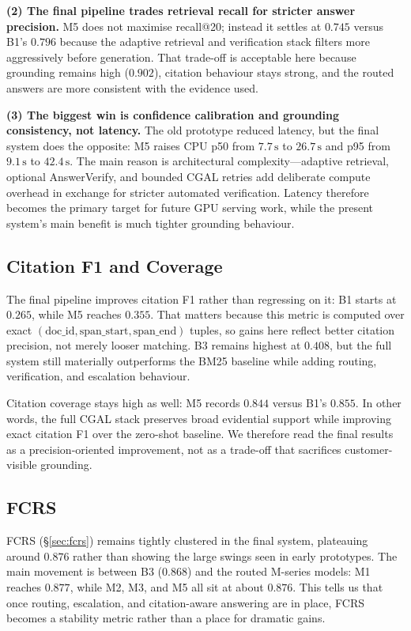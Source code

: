 \documentclass[11pt,a4paper,twocolumn]{article}
\begin{document}
\textbf{(2) The final pipeline trades retrieval recall for stricter answer
precision.} M5 does not maximise recall@20; instead it settles at $0.745$
versus B1's $0.796$ because the adaptive retrieval and verification stack
filters more aggressively before generation. That trade-off is acceptable
here because grounding remains high ($0.902$), citation behaviour stays
strong, and the routed answers are more consistent with the evidence used.

\textbf{(3) The biggest win is confidence calibration and grounding
consistency, not latency.} The old prototype reduced latency, but the final
system does the opposite: M5 raises CPU p50 from $7.7\,\text{s}$ to
$26.7\,\text{s}$ and p95 from $9.1\,\text{s}$ to $42.4\,\text{s}$. The main
reason is architectural complexity---adaptive retrieval, optional
AnswerVerify, and bounded CGAL retries add deliberate compute overhead in
exchange for stricter automated verification. Latency therefore becomes the
primary target for future GPU serving work, while the present system's main
benefit is much tighter grounding behaviour.

\subsection{Citation F1 and Coverage}

The final pipeline improves citation F1 rather than regressing on it:
B1 starts at $0.265$, while M5 reaches $0.355$. That matters because this
metric is computed over exact $(\text{doc\_id}, \text{span\_start},
\text{span\_end})$ tuples, so gains here reflect better citation precision,
not merely looser matching. B3 remains highest at $0.408$, but the full
system still materially outperforms the BM25 baseline while adding routing,
verification, and escalation behaviour.

Citation coverage stays high as well: M5 records $0.844$ versus B1's
$0.855$. In other words, the full CGAL stack preserves broad evidential
support while improving exact citation F1 over the zero-shot baseline. We
therefore read the final results as a precision-oriented improvement, not as
a trade-off that sacrifices customer-visible grounding.

\subsection{FCRS}

FCRS (\S\ref{sec:fcrs}) remains tightly clustered in the final system,
plateauing around $0.876$ rather than showing the large swings seen in early
prototypes. The main movement is between B3 ($0.868$) and the routed
M-series models: M1 reaches $0.877$, while M2, M3, and M5 all sit at about
$0.876$. This tells us that once routing, escalation, and citation-aware
answering are in place, FCRS becomes a stability metric rather than a place
for dramatic gains.
\end{document}
